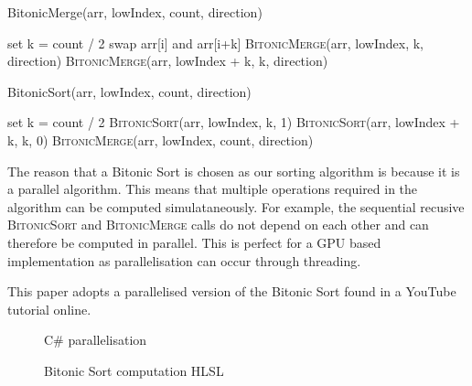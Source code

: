 \documentclass[12pt]{article}
\newcommand{\wideimage}[2][]{%
  \makebox[\textwidth][c]{\texttt{[image: \#2]}}%
}
\begin{document}
    \begin{algorithm}
        \caption{BitonicMerge(arr, lowIndex, count, direction)}
        \begin{algorithmic}[1]
                \State set k = count / 2
                        \State swap arr[i] and arr[i+k]
                    \EndIf
                \EndFor
                \State \textsc{BitonicMerge}(arr, lowIndex, k, direction)
                \State \textsc{BitonicMerge}(arr, lowIndex + k, k, direction)
            \EndIf
        \end{algorithmic}
    \end{algorithm}

    \begin{algorithm}
        \caption{BitonicSort(arr, lowIndex, count, direction)}
        \begin{algorithmic}[1]
                \State set k = count / 2
                \State \textsc{BitonicSort}(arr, lowIndex, k, 1)
                \State \textsc{BitonicSort}(arr, lowIndex + k, k, 0)
                \State \textsc{BitonicMerge}(arr, lowIndex, count, direction)
            \EndIf
        \end{algorithmic}
    \end{algorithm}

    The reason that a Bitonic Sort is chosen as our sorting algorithm is because it is a parallel algorithm. This means that multiple operations required in the algorithm can be computed simulataneously. For example, the sequential recusive \textsc{BitonicSort} and \textsc{BitonicMerge} calls do not depend on each other and can therefore be computed in parallel. This is perfect for a GPU based implementation as parallelisation can occur through threading.

    This paper adopts a parallelised version of the Bitonic Sort found in a YouTube tutorial online\cite{bitonicparallel}.

    \begin{figure}[H]
        \begin{center}
            \wideimage[width=\textwidth]{bitonicSortCSharp.png}
            \caption{C\# parallelisation}
        \end{center}
    \end{figure}

    \begin{figure}[H]
        \begin{center}
            \wideimage[width=0.9\textwidth]{bitonicSortCompute.png}
            \caption{Bitonic Sort computation HLSL}
        \end{center}
    \end{figure}
\end{document}
